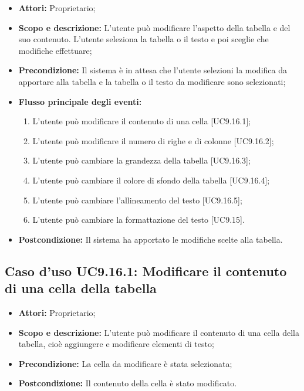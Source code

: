\begin{itemize}
	\item \textbf{Attori:} Proprietario;
	\item \textbf{Scopo e descrizione:} L'utente può modificare l'aspetto della tabella e del suo contenuto. L'utente seleziona la tabella o il testo e poi sceglie che modifiche effettuare;
	\item \textbf{Precondizione:} Il sistema è in attesa che l'utente selezioni la modifica da apportare alla tabella e la tabella o il testo da modificare sono selezionati;
	\item \textbf{Flusso principale degli eventi:}
	\begin{enumerate}
		\item L'utente può modificare il contenuto di una cella [UC9.16.1];
		\item L'utente può modificare il numero di righe e di colonne [UC9.16.2];
		\item L'utente può cambiare la grandezza della tabella [UC9.16.3];
		\item L'utente può cambiare il colore di sfondo della tabella [UC9.16.4];
		\item L'utente può cambiare l'allineamento del testo [UC9.16.5];
		\item L'utente può cambiare la formattazione del testo [UC9.15].
	\end{enumerate}
	\item \textbf{Postcondizione:} Il sistema ha apportato le modifiche scelte alla tabella.
\end{itemize}

	\subsection{Caso d'uso UC9.16.1: Modificare il contenuto di una cella della tabella}
	\begin{itemize}
		\item \textbf{Attori:} Proprietario;
		\item \textbf{Scopo e descrizione:} L'utente può modificare il contenuto di una cella della tabella, cioè aggiungere e modificare elementi di testo;
		\item \textbf{Precondizione:} La cella da modificare è stata selezionata;
		\item \textbf{Postcondizione:} Il contenuto della cella è stato modificato.
	\end{itemize}
	
